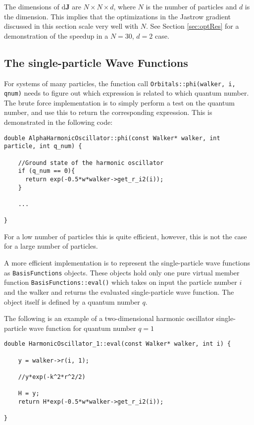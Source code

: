 The dimensions of $\mathrm{d}\mathbf{J}$ are $N\times N\times d$, where $N$ is the number of particles and $d$ is the dimension. This implies that the optimizations in the Jastrow gradient discussed in this section scale very well with $N$. See Section \ref{sec:optRes} for a demonstration of the speedup in a $N=30$, $d=2$ case. 


\subsection{The single-particle Wave Functions}
\label{sec:optSPWFqnumIndie}

For systems of many particles, the function call \verb+Orbitals::phi(walker, i, qnum)+ needs to figure out which expression is related to which quantum number. The brute force implementation is to simply perform a test on the quantum number, and use this to return the corresponding expression. This is demonstrated in the following code:

\clearpage
\vspace{0.25cm}
\begin{lstlisting}
double AlphaHarmonicOscillator::phi(const Walker* walker, int particle, int q_num) {
    
    //Ground state of the harmonic oscillator
    if (q_num == 0){
      return exp(-0.5*w*walker->get_r_i2(i));
    }
    
    ...
    
}
\end{lstlisting}

For a low number of particles this is quite efficient, however, this is not the case for a large number of particles. 

A more efficient implementation is to represent the single-particle wave functions as \verb+BasisFunctions+ objects. These objects hold only one pure virtual member function \verb+BasisFunctions::eval()+ which takes on input the particle number $i$ and the walker and returns the evaluated single-particle wave function. The object itself is defined by a quantum number $q$. 

The following is an example of a two-dimensional harmonic oscillator single-particle wave function for quantum number $q=1$

\vspace{0.25cm}
\begin{lstlisting}
double HarmonicOscillator_1::eval(const Walker* walker, int i) {

    y = walker->r(i, 1);
    
    //y*exp(-k^2*r^2/2)
    
    H = y;
    return H*exp(-0.5*w*walker->get_r_i2(i));
    
}
\end{lstlisting}

